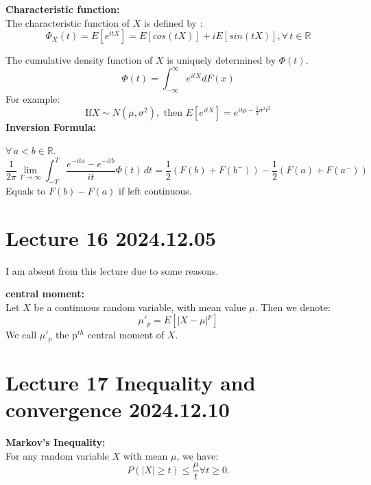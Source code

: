 \documentclass{article}
\begin{document}
\begin{definition}
    \textbf{Characteristic function:}\\
    The characteristic function of $X$ is defined by :
    \begin{equation*}
        \Phi_X(t) = E[e^{itX}] = E[cos(tX)] + iE[sin(tX)], \forall \, t \in \mathbb{R}
    \end{equation*}
\end{definition}
The cumulative density function of $X$ is uniquely determined by $\Phi(t)$.
\begin{equation*}
    \Phi(t) = \int^\infty_{-\infty}e^{itX}dF(x)
\end{equation*}
For example:
\[
    \text{If} X \sim N(\mu,\sigma^2),\text{ then } E[e^{itX}] = e^{it\mu - \frac{1}{2}\sigma^2t^2}
\]
\textbf{Inversion Formula:}

$\forall \, a<b \in \mathbb{R}$.
\begin{equation*}
    \frac{1}{2\pi}\lim_{T \rightarrow \infty}\int^T_{-T}\frac{e^{-ita} - e^{-itb}}{it}\Phi(t)\,dt = \frac{1}{2}(F(b) + F(b^-)) - \frac{1}{2}(F(a) + F(a^-))
\end{equation*}
Equals to $F(b) - F(a)$ if left continuous.





\section{Lecture 16 2024.12.05}
I am absent from this lecture due to some reasons.

\begin{definition}
    \textbf{central moment:}\\
    Let $X$ be a continuous random variable, with mean value $\mu$. Then we denote:
    \[
        \mu'_p = E[|X - \mu|^p]
    \]
    We call $\mu'_p$ the p$^{th}$ central moment of $X$.
\end{definition}


\section{Lecture 17 Inequality and convergence 2024.12.10}

\begin{theorem}
    \textbf{Markov's Inequality:}\\
    For any random variable $X$ with mean $\mu$, we have:
    \[
        P(|X| \geq t) \leq \frac{\mu}{t} \forall t \geq 0.
    \]
\end{theorem}
\end{document}
